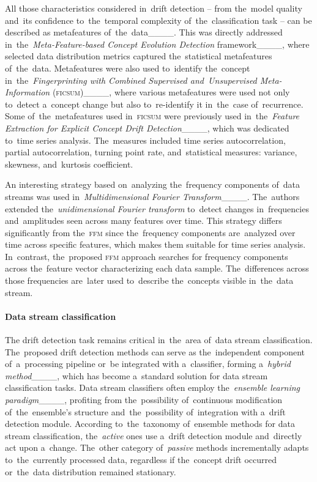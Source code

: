 All those characteristics considered in~drift detection -- from the~model quality and~its confidence to~the~temporal complexity of~the~classification task -- can be described as metafeatures of~the~data____. This was directly addressed in~the~\textit{Meta-Feature-based Concept Evolution Detection} framework____, where selected data distribution metrics captured the~statistical metafeatures of~the~data. Metafeatures were also used to~identify the~concept in~the~\textit{Fingerprinting with Combined Supervised and~Unsupervised Meta-Information} (\textsc{ficsum})____, where various metafeatures were used not only to~detect a~concept change but also to~re-identify it in~the~case of~recurrence. Some of~the~metafeatures used in~\textsc{ficsum} were previously used in~the~\textit{Feature Extraction for Explicit Concept Drift Detection}____, which was dedicated to~time series analysis. The~measures included time series autocorrelation, partial autocorrelation, turning point rate, and~statistical measures: variance, skewness, and~kurtosis coefficient. 

An interesting strategy based on~analyzing the~frequency components of~data streams was used in~\textit{Multidimensional Fourier Transform}____. The~authors extended the~\textit{unidimensional Fourier transform} to~detect changes in~frequencies and~amplitudes seen across many features over time. This strategy differs significantly from the~\textsc{ffm} since the~frequency components are~analyzed over time across specific features, which makes them suitable for time series analysis. In~contrast, the~proposed \textsc{ffm} approach searches for frequency components across the~feature vector characterizing each data sample. The~differences across those frequencies are~later used to~describe the~concepts visible in~the~data stream.

\paragraph{Data stream classification}

The drift detection task remains critical in~the~area of~data stream classification. The~proposed drift detection methods can serve as the~independent component of~a~processing pipeline or~be integrated with a~classifier, forming a~\emph{hybrid method}____, which has become a~standard solution for data stream classification tasks.  Data stream classifiers often employ the~\emph{ensemble learning paradigm}____, profiting from the~possibility of~continuous modification of~the~ensemble's structure and~the~possibility of~integration with a~drift detection module. According to~the~taxonomy of~ensemble methods for data stream classification, the~\textit{active} ones use a~drift detection module and~directly act upon a~change. The~other category of~\textit{passive} methods incrementally adapts to~the~currently processed data, regardless if the~concept drift occurred or~the~data distribution remained stationary.

